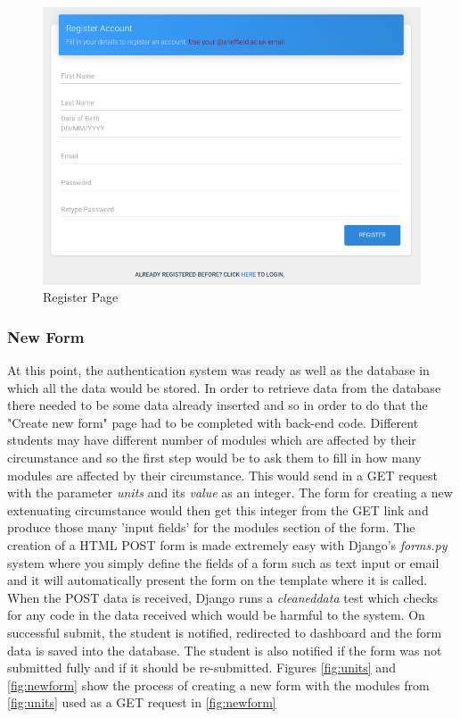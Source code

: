 \documentclass[../main.tex]{subfiles}
\begin{document}
\begin{figure}[H]
	\begin{center}
        \includegraphics[scale=1]
        {images/register.png}
        \caption{\label{fig:register} Register Page}
     \end{center} 
      \end{figure}
 

\subsubsection{New Form}
At this point, the authentication system was ready as well as the database in which all the data would be stored. In order to retrieve data from the database there needed to be some data already inserted and so in order to do that the "Create new form" page had to be completed with back-end code. Different students may have different number of modules which are affected by their circumstance and so the first step would be to ask them to fill in how many modules are affected by their circumstance. This would send in a GET request with the parameter \textit{units} and its \textit{value} as an integer. The form for creating a new extenuating circumstance would then get this integer from the GET link and produce those many 'input fields' for the modules section of the form. The creation of a HTML POST form is made extremely easy with Django's \textit{forms.py} system where you simply define the fields of a form such as text input or email and it will automatically present the form on the template where it is called. When the POST data is received, Django runs a \textit{cleaneddata} test which checks for any code in the data received which would be harmful to the system. On successful submit, the student is notified, redirected to dashboard and the form data is saved into the database. The student is also notified if the form was not submitted fully and if it should be re-submitted. Figures \ref{fig:units} and \ref{fig:newform} show the process of creating a new form with the modules from \ref{fig:units} used as a GET request in \ref{fig:newform}
\end{document}
